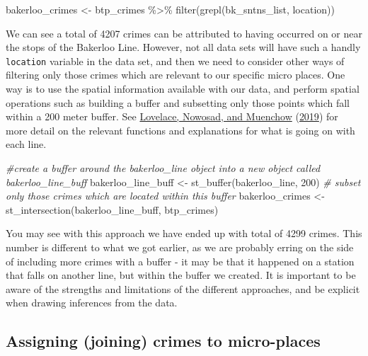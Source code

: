 \documentclass[
  krantz2]{krantz}
\makeatletter
\newenvironment{Shaded}{\begin{snugshade}}{\end{snugshade}}
\newcommand{\CommentTok}[1]{\textcolor[rgb]{0.37,0.37,0.37}{\textit{#1}}}
\newcommand{\DecValTok}[1]{\textcolor[rgb]{0.06,0.06,0.06}{#1}}
\newcommand{\FunctionTok}[1]{\textcolor[rgb]{0,0,0}{#1}}
\newcommand{\NormalTok}[1]{#1}
\newcommand{\OtherTok}[1]{\textcolor[rgb]{0.37,0.37,0.37}{#1}}
\newcommand{\SpecialCharTok}[1]{\textcolor[rgb]{0,0,0}{#1}}
\newenvironment{kframe}{%
\medskip{}
\setlength{\fboxsep}{.8em}
 \def\at@end@of@kframe{}%
 \ifinner\ifhmode%
  \def\at@end@of@kframe{\end{minipage}}%
  \begin{minipage}{\columnwidth}%
 \fi\fi%
 \def\FrameCommand##1{\hskip\@totalleftmargin \hskip-\fboxsep
 \colorbox{shadecolor}{##1}\hskip-\fboxsep
     \hskip-\linewidth \hskip-\@totalleftmargin \hskip\columnwidth}%
 \MakeFramed {\advance\hsize-\width
   \@totalleftmargin\z@ \linewidth\hsize
   \@setminipage}}%
 {\par\unskip\endMakeFramed%
 \at@end@of@kframe}
\renewenvironment{Shaded}{\begin{kframe}}{\end{kframe}}
\makeatother
\begin{document}
\begin{Shaded}
\begin{Highlighting}[]
\NormalTok{bakerloo\_crimes }\OtherTok{\textless{}{-}}\NormalTok{ btp\_crimes }\SpecialCharTok{\%\textgreater{}\%} 
  \FunctionTok{filter}\NormalTok{(}\FunctionTok{grepl}\NormalTok{(bk\_sntns\_list, location))}
\end{Highlighting}
\end{Shaded}

We can see a total of 4207 crimes can be attributed to having occurred on or near the stops of the Bakerloo Line. However, not all data sets will have such a handly \texttt{location} variable in the data set, and then we need to consider other ways of filtering only those crimes which are relevant to our specific micro places. One way is to use the spatial information available with our data, and perform spatial operations such as building a buffer and subsetting only those points which fall within a 200 meter buffer. See \protect\hyperlink{ref-Lovelace_2019}{Lovelace, Nowosad, and Muenchow} (\protect\hyperlink{ref-Lovelace_2019}{2019}) for more detail on the relevant functions and explanations for what is going on with each line.

\begin{Shaded}
\begin{Highlighting}[]
\CommentTok{\#create a buffer around the bakerloo\_line object into a new object called bakerloo\_line\_buff}
\NormalTok{bakerloo\_line\_buff }\OtherTok{\textless{}{-}} \FunctionTok{st\_buffer}\NormalTok{(bakerloo\_line, }\DecValTok{200}\NormalTok{)}
\CommentTok{\# subset only those crimes which are located within this buffer}
\NormalTok{bakerloo\_crimes }\OtherTok{\textless{}{-}} \FunctionTok{st\_intersection}\NormalTok{(bakerloo\_line\_buff, btp\_crimes)}
\end{Highlighting}
\end{Shaded}

You may see with this approach we have ended up with total of 4299 crimes. This number is different to what we got earlier, as we are probably erring on the side of including more crimes with a buffer - it may be that it happened on a station that falls on another line, but within the buffer we created. It is important to be aware of the strengths and limitations of the different approaches, and be explicit when drawing inferences from the data.

\hypertarget{assigning-joining-crimes-to-micro-places}{%
\subsection{Assigning (joining) crimes to micro-places}\label{assigning-joining-crimes-to-micro-places}}
\end{document}
